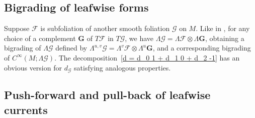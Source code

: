 \documentclass{memo-l}
\theoremstyle{plain}
\theoremstyle{definition}
\theoremstyle{remark}
\newcommand{\FF}{\mathcal{F}}
\newcommand{\GG}{\mathcal{G}}
\newcommand{\bfG}{\boldsymbol{G}}
\numberwithin{section}{chapter}
\numberwithin{equation}{section}%
\begin{document}
\subsection{Bigrading of leafwise forms}\label{ss: bigrading of leafwise forms}

Suppose $\FF$ is subfoliation of another smooth foliation $\GG$ on $M$. Like in , for any choice of a complement $\bfG$ of $T\FF$ in $T\GG$, we have $\Lambda\GG=\Lambda\FF\otimes\Lambda\bfG$, obtaining a bigrading of $\Lambda\GG$ defined by $\Lambda^{u,v}\GG=\Lambda^v\FF\otimes\Lambda^u\bfG$, and a corresponding bigrading of $C^\infty(M;\Lambda\GG)$. The decomposition~\eqref{d = d_0 1 + d_1 0 + d_2 -1} has an obvious version for $d_\GG$ satisfying analogous properties.


\subsection{Push-forward and pull-back of leafwise currents}\label{ss: push-forward of leafwise currents}
\end{document}
